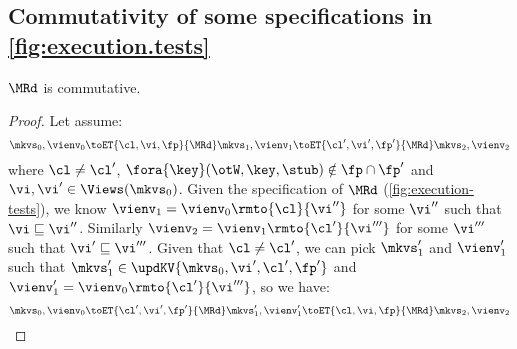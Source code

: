 \subsection{Commutativity of some specifications in \cref{fig:execution.tests}}
\begin{lemma}
    \label{lem:mr-comm}
    \(\MRd\) is commutative.
\end{lemma}
\begin{proof}
    Let assume:
    \[
        \mkvs_0, \vienv_0 \toET{\cl, \vi, \fp}{\MRd} \mkvs_1, \vienv_1 \toET{\cl', \vi', \fp'}{\MRd} \mkvs_2, \vienv_2 
    \]
    where \( \cl \neq \cl' \), \( \fora{ \key } (\otW, \key, \stub) \notin \fp \cap \fp' \) and \( \vi, \vi' \in \Views(\mkvs_0)\).
    Given the specification of \(\MRd\) (\cref{fig:execution-tests}), we know \( \vienv_1 = \vienv_0\rmto{\cl}{\vi''}\) for some \( \vi'' \) such that \( \vi \sqsubseteq \vi'' \).
    Similarly \( \vienv_2 = \vienv_1\rmto{\cl'}{\vi'''} \) for some \( \vi''' \) such that \(  \vi' \sqsubseteq \vi''' \). 
    Given that \( \cl \neq \cl' \), we can pick \( \mkvs'_1 \) and \( \vienv'_1 \) such that \( \mkvs'_1 \in \updKV{\mkvs_0,\vi',\cl',\fp'} \) and \( \vienv'_1 = \vienv_0\rmto{\cl'}{\vi'''} \), so we have:
    \[
        \mkvs_0, \vienv_0 \toET{\cl', \vi', \fp'}{\MRd} \mkvs'_1, \vienv'_1 \toET{\cl, \vi, \fp}{\MRd} \mkvs_2, \vienv_2 
    \]
\end{proof}                                                                                    

